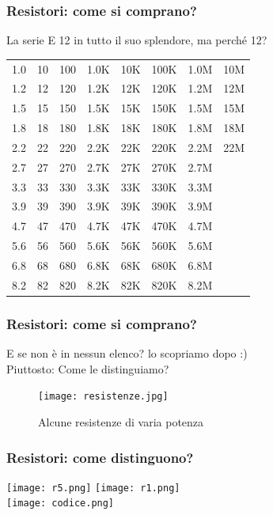 		\begin{frame}[c]\frametitle{Resistori: come si comprano?}

		\centering La serie E 12 in tutto il suo splendore, ma perché 12?
		    
		\begin{tabular}{c|c|c|c|c|c|c|c}
			1.0 & 10 & 100 & 1.0K & 10K & 100K & 1.0M & 10M \\
			1.2 & 12 & 120 & 1.2K & 12K & 120K & 1.2M & 12M \\ 
			1.5 & 15 & 150 & 1.5K & 15K & 150K & 1.5M & 15M  \\
			1.8 & 18 & 180 & 1.8K & 18K & 180K & 1.8M & 18M  \\
			2.2 & 22 & 220 & 2.2K & 22K & 220K & 2.2M & 22M  \\
			2.7 & 27 & 270 & 2.7K & 27K & 270K & 2.7M & \\
			3.3 & 33 & 330 & 3.3K & 33K & 330K & 3.3M & \\
			3.9 & 39 & 390 & 3.9K & 39K & 390K & 3.9M & \\
			4.7 & 47 & 470 & 4.7K & 47K & 470K & 4.7M & \\
			5.6 & 56 & 560 & 5.6K & 56K & 560K & 5.6M & \\
			6.8 & 68 & 680 & 6.8K & 68K & 680K & 6.8M & \\
			8.2 & 82 & 820 & 8.2K & 82K & 820K & 8.2M & \\
		\end{tabular}
		
		\end{frame}

		\begin{frame}[c]\frametitle{Resistori: come si comprano?}
		
		E se non è in nessun elenco? lo scopriamo dopo :)\\
		Piuttosto: Come le distinguiamo?\\
		
		\begin{figure}[tb]
			\centering
			\texttt{[image: resistenze.jpg]}
			\caption{Alcune resistenze di varia potenza}
			\label{fig:resistenze1}
		\end{figure}
		
		\end{frame}

		\begin{frame}[c]\frametitle{Resistori: come distinguono?}
			\texttt{[image: r5.png]}
		    \texttt{[image: r1.png]}\\
		    \centering \texttt{[image: codice.png]}
		\end{frame}

